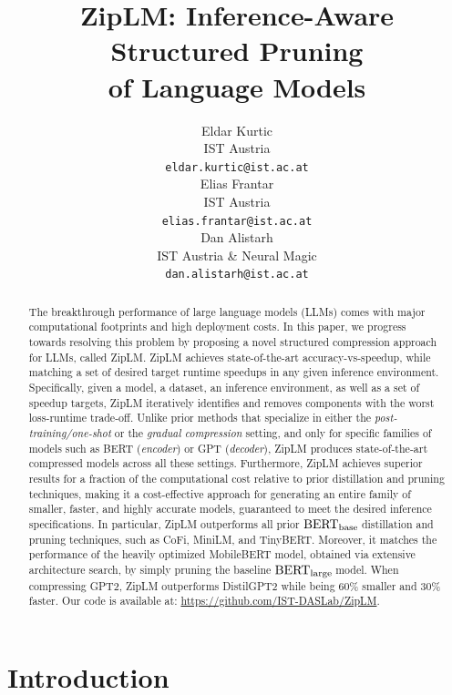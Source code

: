 \documentclass{article}
\title{ZipLM: Inference-Aware Structured Pruning \\ of Language Models}
\author{%
  Eldar Kurtic \\
  IST Austria\\
  \texttt{eldar.kurtic@ist.ac.at} \\
  \And
  Elias Frantar \\
  IST Austria\\
  \texttt{elias.frantar@ist.ac.at} \\
  \And
  Dan Alistarh \\
  IST Austria \& Neural Magic \\
  \texttt{dan.alistarh@ist.ac.at} \\
}
\newcommand{\bertbase}{$\textrm{BERT}_{\small{\textrm{base}}}\,$}
\newcommand{\bertlarge}{$\textrm{BERT}_{\small{\textrm{large}}}\,$}
\newcommand{\ourmethod}{ZipLM}
\theoremstyle{plain}
\theoremstyle{definition}
\theoremstyle{remark}
\begin{document}
\maketitle

\begin{abstract}
The breakthrough performance of large language models (LLMs) comes with major computational footprints and high deployment costs. In this paper, we progress towards resolving this problem by proposing a novel structured compression approach for LLMs, called \ourmethod{}. \ourmethod{} achieves state-of-the-art \mbox{accuracy-vs-speedup}, while matching a set of desired target runtime speedups in any given inference environment. Specifically, given a model, a dataset, an inference environment, as well as a set of speedup targets, \ourmethod{} iteratively identifies and removes components with the worst loss-runtime trade-off. Unlike prior methods that specialize in either the \emph{post-training/one-shot} or the \emph{gradual compression} setting, and only for specific families of models such as BERT (\emph{encoder}) or GPT (\emph{decoder}), \ourmethod{} produces state-of-the-art compressed models across all these settings. Furthermore, \ourmethod{} achieves superior results for a fraction of the computational cost relative to prior distillation and pruning techniques, making it a cost-effective approach for generating an entire family of smaller, faster, and highly accurate models, guaranteed to meet the desired inference specifications. In particular, \ourmethod{} outperforms all prior \bertbase distillation and pruning techniques, such as CoFi, MiniLM, and TinyBERT. Moreover, it matches the performance of the heavily optimized MobileBERT model, obtained via extensive architecture search, by simply pruning the baseline \bertlarge model. When compressing GPT2, \ourmethod{} outperforms DistilGPT2 while being 60\% smaller and 30\% faster. Our code is available at: \href{https://github.com/IST-DASLab/ZipLM }{https://github.com/IST-DASLab/ZipLM}. 
\end{abstract}

\section{Introduction} 
\end{document}
